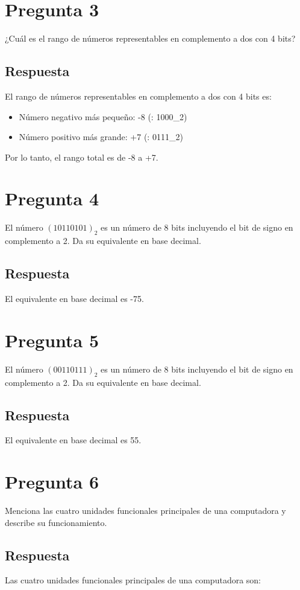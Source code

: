 \documentclass{article}
\begin{document}
\section*{Pregunta 3}
¿Cuál es el rango de números representables en complemento a dos con 4 bits?

\subsection*{Respuesta}
El rango de números representables en complemento a dos con 4 bits es:
\begin{itemize}
\item Número negativo más pequeño: -8 \quad (: 1000_2)
\item Número positivo más grande: +7 \quad (: 0111_2)
\end{itemize}

Por lo tanto, el rango total es de -8 a +7.

\section*{Pregunta 4}
El número \((10110101)_2\) es un número de 8 bits incluyendo el bit de signo en complemento a 2.
Da su equivalente en base decimal.

\subsection*{Respuesta}
El equivalente en base decimal es -75.

\section*{Pregunta 5}
El número \((00110111)_2\) es un número de 8 bits incluyendo el bit de signo en complemento a 2.
Da su equivalente en base decimal.

\subsection*{Respuesta}
El equivalente en base decimal es 55.

\section*{Pregunta 6}
Menciona las cuatro unidades funcionales principales de una computadora y describe su funcionamiento.

\subsection*{Respuesta}
Las cuatro unidades funcionales principales de una computadora son:
\end{document}
